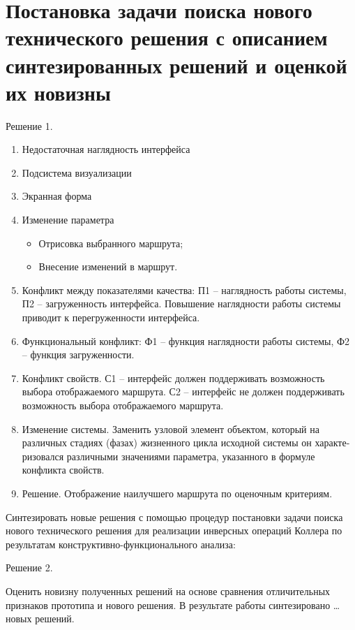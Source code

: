 \chapter{Постановка задачи поиска нового технического решения с описанием синтезированных решений и 
    оценкой их новизны}
Решение 1.
\begin{enumerate}
    \item Недостаточная наглядность интерфейса
    \item Подсистема визуализации
    \item Экранная форма
    \item Изменение параметра
    \begin{itemize}
        \item Отрисовка выбранного маршрута;
        \item Внесение изменений в маршрут.
    \end{itemize}
    \item Конфликт между показателями качества: П1 -- наглядность работы системы, 
        П2 -- загруженность интерфейса. Повышение наглядности работы системы приводит к 
        перегруженности интерфейса.
    \item Функциональный конфликт: Ф1 -- функция наглядности работы системы, Ф2 -- 
        функция загруженности.
    \item Конфликт свойств. С1 -- интерфейс должен поддерживать возможность выбора отображаемого 
        маршрута. С2 -- интерфейс не должен поддерживать возможность выбора отображаемого маршрута.
    \item Изменение системы. Заменить узловой элемент объектом, который на различных стадиях (фазах) 
        жизненного цикла исходной системы он характе­ризовался различными значениями параметра, 
        указанного в формуле конфликта свойств.
    \item Решение. Отображение наилучшего маршрута по оценочным критериям.
\end{enumerate}

Синтезировать новые решения с помощью процедур постановки задачи поиска нового технического решения 
для реализации инверсных операций Коллера по результатам конструктивно-функционального анализа:

Решение 2.

Оценить новизну полученных решений на основе сравнения отличительных признаков прототипа и нового решения. 
В результате работы синтезировано \ldots новых решений.

